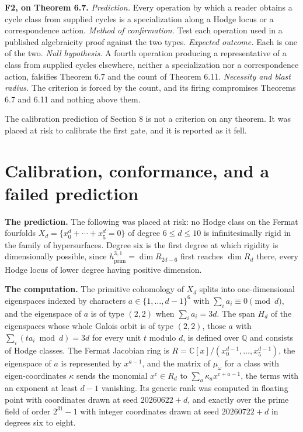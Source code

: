 \documentclass[10pt,twocolumn]{article}
\begin{document}
\textbf{F2, on Theorem 6.7.} \emph{Prediction.} Every operation by which
a reader obtains a cycle class from supplied cycles is a specialization
along a Hodge locus or a correspondence action. \emph{Method of
confirmation.} Test each operation used in a published algebraicity
proof against the two types. \emph{Expected outcome.} Each is one of the
two. \emph{Null hypothesis.} A fourth operation producing a
representative of a class from supplied cycles elsewhere, neither a
specialization nor a correspondence action, falsifies Theorem 6.7 and
the count of Theorem 6.11. \emph{Necessity and blast radius.} The
criterion is forced by the count, and its firing compromises Theorems
6.7 and 6.11 and nothing above them.

The calibration prediction of Section 8 is not a criterion on any
theorem. It was placed at risk to calibrate the first gate, and it is
reported as it fell.

\hypertarget{calibration-conformance-and-a-failed-prediction}{%
\section{Calibration, conformance, and a failed
prediction}\label{calibration-conformance-and-a-failed-prediction}}

\textbf{The prediction.} The following was placed at risk: no Hodge
class on the Fermat fourfolds \(X_d=\{x_0^d+\cdots+x_5^d=0\}\) of degree
\(6\le d\le 10\) is infinitesimally rigid in the family of
hypersurfaces. Degree six is the first degree at which rigidity is
dimensionally possible, since \(h^{3,1}_{\mathrm{prim}}=\dim R_{2d-6}\)
first reaches \(\dim R_d\) there, every Hodge locus of lower degree
having positive dimension.

\textbf{The computation.} The primitive cohomology of \(X_d\) splits
into one-dimensional eigenspaces indexed by characters
\(a\in\{1,\dots,d-1\}^6\) with \(\sum_i a_i\equiv 0 \pmod d\), and the
eigenspace of \(a\) is of type \((2,2)\) when \(\sum_i a_i=3d\). The
span \(H_d\) of the eigenspaces whose whole Galois orbit is of type
\((2,2)\), those \(a\) with \(\sum_i(ta_i \bmod d)=3d\) for every unit
\(t\) modulo \(d\), is defined over \(\mathbb{Q}\) and consists of Hodge
classes. The Fermat Jacobian ring is
\(R=\mathbb{C}[x]/(x_0^{d-1},\dots,x_5^{d-1})\), the eigenspace of \(a\)
is represented by \(x^{a-1}\), and the matrix of \(\mu_\omega\) for a
class with eigen-coordinates \(\kappa\) sends the monomial
\(x^c\in R_d\) to \(\sum_a\kappa_a x^{c+a-1}\), the terms with an
exponent at least \(d-1\) vanishing. Its generic rank was computed in
floating point with coordinates drawn at seed \(20260622+d\), and
exactly over the prime field of order \(2^{31}-1\) with integer
coordinates drawn at seed \(20260722+d\) in degrees six to eight.
\end{document}
